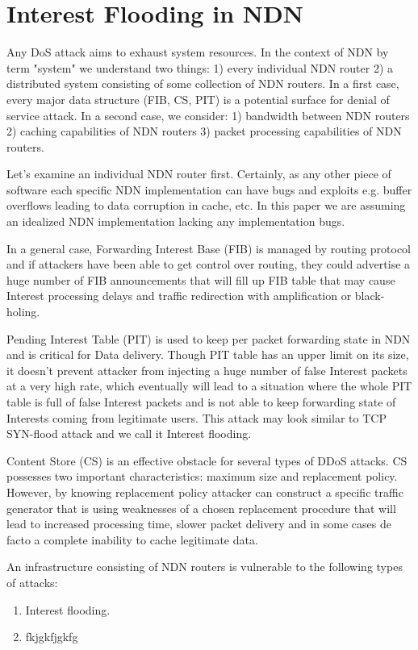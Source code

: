 \section{Interest Flooding in NDN}
\label{sec:interest flooding}

Any DoS attack aims to exhaust system resources. In the context of NDN by term "system" we understand two things: 1) every individual NDN router 2) a distributed system consisting of some collection of NDN routers. In a first case, every major data structure (FIB, CS, PIT) is a potential surface for denial of service attack. In a second case, we consider: 1) bandwidth between NDN routers 2) caching capabilities of NDN routers 3) packet processing capabilities of NDN routers.

Let's examine an individual NDN router first. Certainly, as any other piece of software each specific NDN implementation can have bugs and exploits e.g. buffer overflows leading to data corruption in cache, etc. In this paper we are assuming an idealized NDN implementation lacking any implementation bugs. 

In a general case, Forwarding Interest Base (FIB) is managed by routing protocol and if attackers have been able to get control over routing, they could advertise a huge number of FIB announcements that will fill up FIB table that may cause Interest processing delays and traffic redirection with amplification or black-holing.

Pending Interest Table (PIT) is used to keep per packet forwarding state in NDN and is critical for Data delivery. Though PIT table has an upper limit on its size, it doesn't prevent attacker from injecting a huge number of false Interest packets at a very high rate, which eventually will lead to a situation where the whole PIT table is full of false Interest packets and is not able to keep forwarding state of Interests coming from legitimate users. This attack may look similar to TCP SYN-flood attack and we call it Interest flooding. 

Content Store (CS) is an effective obstacle for several types of DDoS attacks. CS possesses two important characteristics: maximum size and replacement policy. However, by knowing replacement policy attacker can construct a specific traffic generator that is using weaknesses of a chosen replacement procedure that will lead to increased processing time, slower packet delivery and in some cases de facto a complete inability to cache legitimate data. 

An infrastructure consisting of NDN routers is vulnerable to the following types of attacks: 
\begin{enumerate}
\item Interest flooding. 
\item fkjgkfjgkfg
\end{enumerate} 




